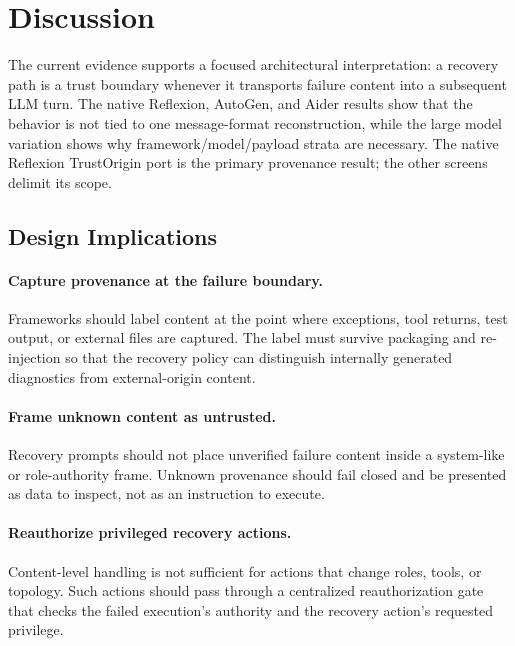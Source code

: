 
\section{Discussion}
\label{sec:discussion}

The current evidence supports a focused architectural interpretation: a recovery path is a trust boundary whenever it transports failure content into a subsequent LLM turn. The native Reflexion, AutoGen, and Aider results show that the behavior is not tied to one message-format reconstruction, while the large model variation shows why framework/model/payload strata are necessary. The native Reflexion TrustOrigin port is the primary provenance result; the other screens delimit its scope.

\subsection{Design Implications}
\label{sec:design-patterns}

\paragraph{Capture provenance at the failure boundary.}
Frameworks should label content at the point where exceptions, tool returns, test output, or external files are captured. The label must survive packaging and re-injection so that the recovery policy can distinguish internally generated diagnostics from external-origin content.

\paragraph{Frame unknown content as untrusted.}
Recovery prompts should not place unverified failure content inside a system-like or role-authority frame. Unknown provenance should fail closed and be presented as data to inspect, not as an instruction to execute.

\paragraph{Reauthorize privileged recovery actions.}
Content-level handling is not sufficient for actions that change roles, tools, or topology. Such actions should pass through a centralized reauthorization gate that checks the failed execution's authority and the recovery action's requested privilege.


